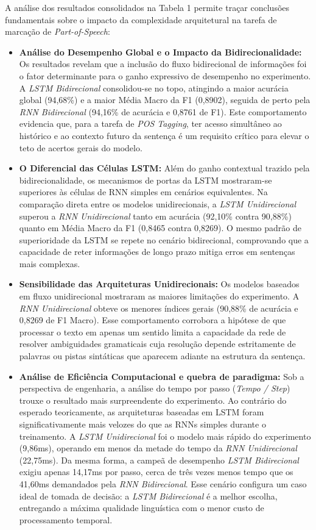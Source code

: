 \documentclass[a4paper,12pt]{article}
\begin{document}
A análise dos resultados consolidados na Tabela 1 permite traçar conclusões fundamentais sobre o impacto da complexidade arquitetural na tarefa de marcação de \textit{Part-of-Speech}:

\begin{itemize}
\item \textbf{Análise do Desempenho Global e o Impacto da Bidirecionalidade:} Os resultados revelam que a inclusão do fluxo bidirecional de informações foi o fator determinante para o ganho expressivo de desempenho no experimento. A \textit{LSTM Bidirecional} consolidou-se no topo, atingindo a maior acurácia global (94,68\%) e a maior Média Macro da F1 (0,8902), seguida de perto pela \textit{RNN Bidirecional} (94,16\% de acurácia e 0,8761 de F1). Este comportamento evidencia que, para a tarefa de \textit{POS Tagging}, ter acesso simultâneo ao histórico e ao contexto futuro da sentença é um requisito crítico para elevar o teto de acertos gerais do modelo.

\item \textbf{O Diferencial das Células LSTM:} Além do ganho contextual trazido pela bidirecionalidade, os mecanismos de portas da LSTM mostraram-se superiores às células de RNN simples em cenários equivalentes. Na comparação direta entre os modelos unidirecionais, a \textit{LSTM Unidirecional} superou a \textit{RNN Unidirecional} tanto em acurácia (92,10\% contra 90,88\%) quanto em Média Macro da F1 (0,8465 contra 0,8269). O mesmo padrão de superioridade da LSTM se repete no cenário bidirecional, comprovando que a capacidade de reter informações de longo prazo mitiga erros em sentenças mais complexas.

\item \textbf{Sensibilidade das Arquiteturas Unidirecionais:} Os modelos baseados em fluxo unidirecional mostraram as maiores limitações do experimento. A \textit{RNN Unidirecional} obteve os menores índices gerais (90,88\% de acurácia e 0,8269 de F1 Macro). Esse comportamento corrobora a hipótese de que processar o texto em apenas um sentido limita a capacidade da rede de resolver ambiguidades gramaticais cuja resolução depende estritamente de palavras ou pistas sintáticas que aparecem adiante na estrutura da sentença.

\item \textbf{Análise de Eficiência Computacional e quebra de paradigma:} Sob a perspectiva de engenharia, a análise do tempo por passo (\textit{Tempo / Step}) trouxe o resultado mais surpreendente do experimento. Ao contrário do esperado teoricamente, as arquiteturas baseadas em LSTM foram significativamente mais velozes do que as RNNs simples durante o treinamento. A \textit{LSTM Unidirecional} foi o modelo mais rápido do experimento (9,86ms), operando em menos da metade do tempo da \textit{RNN Unidirecional} (22,75ms). Da mesma forma, a campeã de desempenho \textit{LSTM Bidirecional} exigiu apenas 14,17ms por passo, cerca de três vezes menos tempo que os 41,60ms demandados pela \textit{RNN Bidirecional}. Esse cenário configura um caso ideal de tomada de decisão: a \textit{LSTM Bidirecional} é a melhor escolha, entregando a máxima qualidade linguística com o menor custo de processamento temporal.


\end{itemize}
\end{document}
